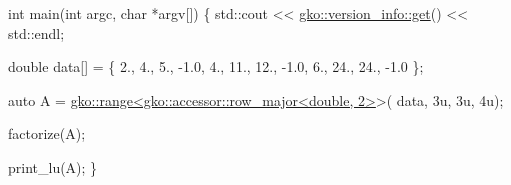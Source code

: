 \begin{DoxyCodeInclude}
\textcolor{keywordtype}{int} main(\textcolor{keywordtype}{int} argc, \textcolor{keywordtype}{char} *argv[])
\{
    std::cout << \hyperlink{classgko_1_1version__info_a6daeb8a087cfb57fa055526fc133d8eb}{gko::version\_info::get}() << std::endl;

    \textcolor{keywordtype}{double} data[] = \{
        2.,  4.,  5., -1.0,
        4., 11., 12., -1.0,
        6., 24., 24., -1.0
    \};

    \textcolor{keyword}{auto} A = \hyperlink{classgko_1_1range}{gko::range<gko::accessor::row\_major<double, 2>}>(
      data, 3u, 3u, 4u);

    factorize(A);

    print\_lu(A);
\}
\end{DoxyCodeInclude}
 